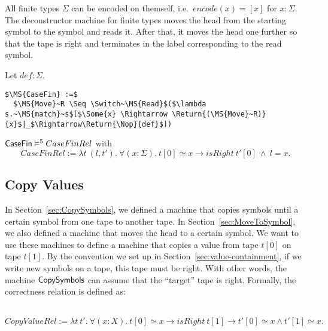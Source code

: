 All finite types $\Sigma$ can be encoded on themself, i.e.\ $encode(x)=[x]$ for $x:\Sigma$.  The deconstructor machine for finite types moves the head
from the starting symbol to the symbol and reads it.  After that, it moves the head one further so that the tape is right and terminates in the label
corresponding to the read symbol.

%
\begin{definition}[$\MS{CaseFin}$][CaseFin]
  \label{def:CaseFin}
  Let $def:\Sigma$.
  \small
\begin{lstlisting}[style=semicoqstyle]
$\MS{CaseFin} :=$
  $\MS{Move}~R \Seq \Switch~\MS{Read}$($\lambda s.~\MS{match}~s$[$\Some{x} \Rightarrow \Return{(\MS{Move}~R)}{x}$|_$\Rightarrow\Return{\Nop}{def}$])
\end{lstlisting}
\end{definition}

\begin{lemma}
  \label{lem:CaseFin_Sem}
  $\mathsf{CaseFin} \mathrel{\vDash^{5}} CaseFinRel$ with
  \[
    CaseFinRel := \lambda t~(l,t').~\forall(x:\Sigma).~t[0] \simeq x \rightarrow isRight~t'[0] ~\land~ l=x.
  \]
\end{lemma}




\subsection{Copy Values}
\label{sec:copy}

In Section~\ref{sec:CopySymbols}, we defined a machine that copies symbols until a certain symbol from one tape to another tape.  In
Section~\ref{sec:MoveToSymbol}, we also defined a machine that moves the head to a certain symbol.  We want to use these machines to define a machine
that copies a value from tape $t[0]$ on tape $t[1]$.  By the convention we set up in Section~\ref{sec:value-containment}, if we write new symbols on a
tape, this tape must be right.  With other words, the machine $\mathsf{CopySymbols}$ can assume that the ``target'' tape is right.  Formally, the
correctness relation is defined as:
%
\begin{definition}
  \label{def:CopyValue_Rel}
  ~
  \[
    CopyValueRel := \lambda t~t'.~\forall (x:X).~t[0] \simeq x \rightarrow isRight~t[1] \rightarrow t'[0] \simeq x \land t'[1] \simeq x.
  \]
\end{definition}

